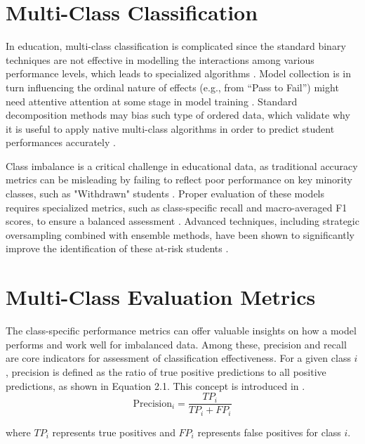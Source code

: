 \documentclass[ %
                    author={Carlos Duran Calle},
                supervisor={Dr. Felipe Campelo},
                    degree={MSc},
                     title={Comparative Machine Learning Analysis for Student Dropout Prediction in a Virtual Learning Environment},
                  subtitle={Incorporating Student Engagement and Socio-Economic Features},
                      type={},
                      year={2025}]{dissertation}
\begin{document}
\section{Multi-Class Classification}
In education, multi-class classification is complicated since the standard binary techniques are not effective in modelling the interactions among various performance levels, which leads to specialized algorithms \cite{fernandez_learning_2018}. Model collection is in turn influencing the ordinal nature of effects (e.g., from “Pass to Fail”) might need attentive attention at some stage in model training \cite{liu_exploratory_2009}. Standard decomposition methods may bias such type of ordered data, which validate why it is useful to apply native multi-class algorithms in order to predict student performances accurately \cite{krawczyk_learning_2016}.

Class imbalance is a critical challenge in educational data, as traditional accuracy metrics can be misleading by failing to reflect poor performance on key minority classes, such as "Withdrawn" students \cite{haixiang_learning_2017}. Proper evaluation of these models requires specialized metrics, such as class-specific recall and macro-averaged F1 scores, to ensure a balanced assessment \cite{luque_impact_2019}. Advanced techniques, including strategic oversampling combined with ensemble methods, have been shown to significantly improve the identification of these at-risk students \cite{galar_review_2012}.

\section{Multi-Class Evaluation Metrics}
The class-specific performance metrics can offer valuable insights on how a model performs and work well for imbalanced data. Among these, precision and recall are core indicators for assessment of classification effectiveness. For a given class $i$, precision is defined as the ratio of true positive predictions to all positive predictions, as shown in Equation 2.1. This concept is introduced in \cite{sokolova_classification_tasks_2009}.
\begin{equation}
	\text{Precision}_{i} = \frac{TP_{i}}{TP_{i} + FP_{i}}
	\tag{2.1}
\end{equation}
\begin{center}
	where $TP_{i}$ represents true positives and $FP_{i}$ represents false positives for class $i$.
\end{center}
\end{document}

